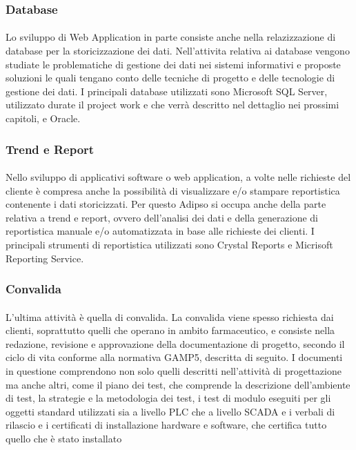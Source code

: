   \subsubsection{Database}
  \paragraph{}
  Lo sviluppo di Web Application in parte consiste anche nella relazizzazione di database per la storicizzazione 
  dei dati. Nell'attivita relativa ai database vengono studiate le problematiche di gestione dei dati 
  nei sistemi informativi e proposte soluzioni le quali tengano conto delle tecniche di progetto e
  delle tecnologie di gestione dei dati. I principali database utilizzati sono Microsoft SQL Server, utilizzato 
  durate il project work e che verrà descritto nel dettaglio nei prossimi capitoli, e Oracle.
  \subsubsection{Trend e Report}
  \paragraph{}
  Nello sviluppo di applicativi software o web application, a volte nelle richieste del cliente è compresa 
  anche la possibilità di visualizzare e/o stampare reportistica contenente i dati storicizzati. Per questo 
  Adipso si occupa anche della parte relativa a trend e report, ovvero dell'analisi dei dati e della 
  generazione di reportistica manuale e/o automatizzata in base alle richieste dei clienti. I principali 
  strumenti di reportistica utilizzati sono Crystal Reports e Micrisoft Reporting Service.
  \subsubsection{Convalida}
  \paragraph{}
  L'ultima attività è quella di convalida. La convalida viene spesso richiesta dai clienti, soprattutto 
  quelli che operano in ambito farmaceutico, e consiste nella redazione, revisione e approvazione 
  della documentazione di progetto, secondo il ciclo di vita conforme alla normativa GAMP5, descritta di seguito. 
  I documenti in questione comprendono non solo quelli descritti nell'attività di progettazione ma anche altri,
  come il piano dei test, che comprende la descrizione dell'ambiente di test, la strategie e la metodologia dei test, 
  i test di modulo eseguiti per gli oggetti standard utilizzati sia a livello PLC che a livello SCADA e i 
  verbali di rilascio e i certificati di installazione hardware e software, che certifica tutto quello che 
  è stato installato
